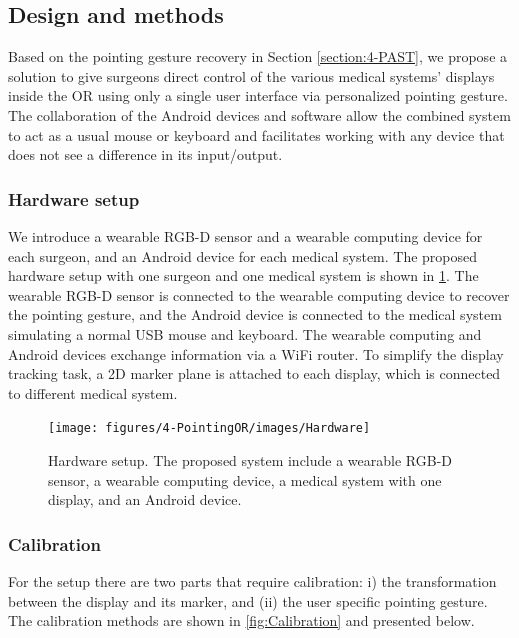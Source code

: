 \subsection{Design and methods} \label{sec:IPCAI:Methods}
Based on the pointing gesture recovery in Section \ref{section:4-PAST}, we propose a solution to give surgeons direct control of the various medical systems' displays inside the OR using only a single user interface via personalized pointing gesture. The collaboration of the Android devices and software allow the combined system to act as a usual mouse or keyboard and facilitates working with any device that does not see a difference in its input/output.

\subsubsection{Hardware setup}
We introduce a wearable RGB-D sensor and a wearable computing device for each surgeon, and an Android device for each medical system. 
The proposed hardware setup with one surgeon and one medical system is shown in  \figurename{\ref{fig:Hardware}}.
The wearable RGB-D sensor is connected to the wearable computing device to recover the pointing gesture, and the Android device is connected to the medical system simulating a normal USB mouse and keyboard. The wearable computing and Android devices exchange information via a WiFi router. To simplify the display tracking task, a 2D marker plane is attached to each display, which is connected to different medical system.
\begin{figure}
	\centering
	\texttt{[image: figures/4-PointingOR/images/Hardware]}
	\caption{Hardware setup. The proposed system include a wearable RGB-D sensor, a wearable computing device, a medical system with one display, and an Android device.}
	\label{fig:Hardware}       %
\end{figure}

\subsubsection{Calibration} \label{sec:OR:calibration}
For the setup there are two parts that require calibration: i) the transformation between the display and its marker, and (ii) the user specific pointing gesture. The calibration methods are shown in \figurename{\ref{fig:Calibration}} and presented below.

